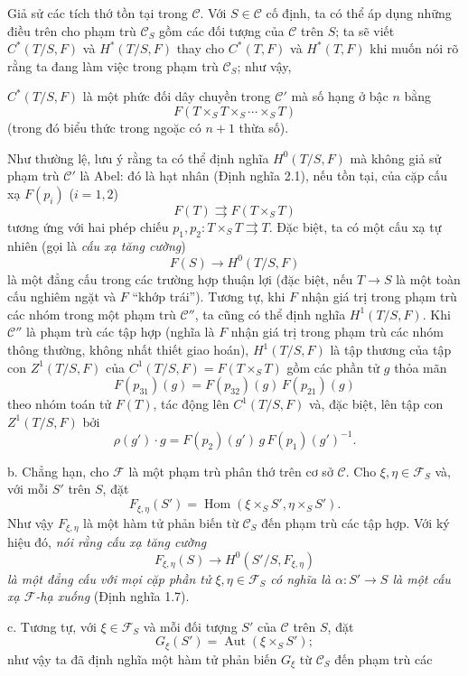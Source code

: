 \documentclass[11pt,twoside,openany]{book}
\numberwithin{equation}{section}
\newcommand{\src}[1]{%
  \phantomsection\hypertarget{src:\fgasourceid:#1}{}%
  \marginpar{\raggedleft\footnotesize\sffamily #1}%
}
\newcommand{\fgasourceid}{unset}
\begin{document}
Giả sử các tích thớ tồn tại trong $\mathcal C$. Với $S\in\mathcal C$ cố định,
ta có thể áp dụng những điều trên cho phạm trù $\mathcal C_S$ gồm các đối tượng
của $\mathcal C$ trên $S$; ta sẽ viết $C^*(T/S,F)$ và $H^*(T/S,F)$ thay cho
$C^*(T,F)$ và $H^*(T,F)$ khi muốn nói rõ rằng ta đang làm việc trong phạm trù
$\mathcal C_S$; như vậy,

\src{311}
$C^*(T/S,F)$ là một phức đối dây chuyền trong $\mathcal C'$ mà số hạng ở bậc
$n$ bằng
\[
  F(T\times_ST\times_S\cdots\times_ST)
\]
(trong đó biểu thức trong ngoặc có $n+1$ thừa số).

Như thường lệ, lưu ý rằng ta có thể định nghĩa $H^0(T/S,F)$ mà không giả sử
phạm trù $\mathcal C'$ là Abel: đó là hạt nhân (Định nghĩa 2.1), nếu tồn tại,
của cặp cấu xạ $F(p_i)$ ($i=1,2$)
\[
  F(T)\rightrightarrows F(T\times_ST)
\]
tương ứng với hai phép chiếu
$p_1,p_2:T\times_ST\rightrightarrows T$. Đặc biệt, ta có một cấu xạ tự nhiên
(gọi là \emph{cấu xạ tăng cường})
\[
  F(S)\longrightarrow H^0(T/S,F)
\]
là một đẳng cấu trong các trường hợp thuận lợi (đặc biệt, nếu
$T\longrightarrow S$ là một toàn cấu nghiêm ngặt và $F$ “khớp trái”).
Tương tự, khi $F$ nhận giá trị trong phạm trù các nhóm trong một phạm trù
$\mathcal C''$, ta cũng có thể định nghĩa $H^1(T/S,F)$. Khi $\mathcal C''$ là
phạm trù các tập hợp (nghĩa là $F$ nhận giá trị trong phạm trù các nhóm thông
thường, không nhất thiết giao hoán), $H^1(T/S,F)$ là tập thương của tập con
$Z^1(T/S,F)$ của $C^1(T/S,F)=F(T\times_ST)$ gồm các phần tử $g$ thỏa mãn
\[
  F(p_{31})(g)=F(p_{32})(g)\,F(p_{21})(g)
\]
theo nhóm toán tử $F(T)$, tác động lên $C^1(T/S,F)$ và, đặc biệt, lên tập con
$Z^1(T/S,F)$ bởi
\[
  \rho(g')\cdot g=F(p_2)(g')\,g\,F(p_1)(g')^{-1}.
\]

\medskip\noindent
b. Chẳng hạn, cho $\mathcal F$ là một phạm trù phân thớ trên cơ sở
$\mathcal C$. Cho $\xi,\eta\in\mathcal F_S$ và, với mỗi $S'$ trên $S$, đặt
\[
  F_{\xi,\eta}(S')=
  \operatorname{Hom}(\xi\times_SS',\eta\times_SS').
\]
Như vậy $F_{\xi,\eta}$ là một hàm tử phản biến từ $\mathcal C_S$ đến phạm trù
các tập hợp. Với ký hiệu đó, \emph{nói rằng cấu xạ tăng cường}
\[
  F_{\xi,\eta}(S)\longrightarrow H^0(S'/S,F_{\xi,\eta})
\]
\emph{là một đẳng cấu với mọi cặp phần tử
$\xi,\eta\in\mathcal F_S$ có nghĩa là
$\alpha:S'\longrightarrow S$ là một cấu xạ $\mathcal F$-hạ xuống}
(Định nghĩa 1.7).

\medskip\noindent
c. Tương tự, với $\xi\in\mathcal F_S$ và mỗi đối tượng $S'$ của $\mathcal C$
trên $S$, đặt
\[
  G_\xi(S')=\operatorname{Aut}(\xi\times_SS') ;
\]
như vậy ta đã định nghĩa một hàm tử phản biến $G_\xi$ từ $\mathcal C_S$ đến
phạm trù các
\end{document}

